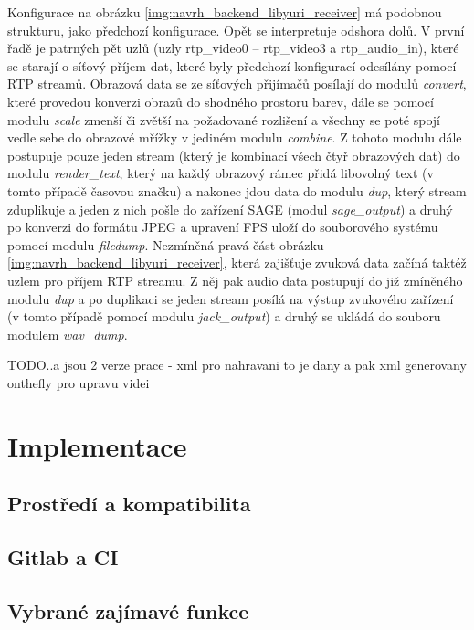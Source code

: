 \documentclass[thesis=M,czech]{FITthesis}[2012/06/26]
\begin{document}
Konfigurace na obrázku \ref{img:navrh_backend_libyuri_receiver} má podobnou strukturu, jako předchozí konfigurace. Opět se interpretuje odshora dolů. V první řadě je patrných pět uzlů (uzly rtp\_video0 -- rtp\_video3 a rtp\_audio\_in), které se starají o síťový příjem dat, které byly předchozí konfigurací odesílány pomocí RTP streamů. Obrazová data se ze síťových přijímačů posílají do modulů \textit{convert}, které provedou konverzi obrazů do shodného prostoru barev, dále se pomocí modulu \textit{scale} zmenší či zvětší na požadované rozlišení a všechny se poté spojí vedle sebe do obrazové mřížky v jediném modulu \textit{combine}. Z tohoto modulu dále postupuje pouze jeden stream (který je kombinací všech čtyř obrazových dat) do modulu \textit{render\_text}, který na každý obrazový rámec přidá libovolný text (v tomto případě časovou značku) a nakonec jdou data do modulu \textit{dup}, který stream zduplikuje a jeden z nich pošle do zařízení SAGE (modul \textit{sage\_output}) a druhý po konverzi do formátu JPEG a upravení FPS uloží do souborového systému pomocí modulu \textit{filedump}. Nezmíněná pravá část obrázku \ref{img:navrh_backend_libyuri_receiver}, která zajišťuje zvuková data začíná taktéž uzlem pro příjem RTP streamu. Z něj pak audio data postupují do již zmíněného modulu \textit{dup} a po duplikaci se jeden stream posílá na výstup zvukového zařízení (v tomto případě pomocí modulu \textit{jack\_output}) a druhý se ukládá do souboru modulem \textit{wav\_dump}.


TODO..a jsou 2 verze prace - xml  pro nahravani to je dany a pak xml generovany onthefly pro upravu videi


\chapter{Implementace} \label{chap:impl}
\section{Prostředí a kompatibilita} \label{sec:impl_prostredi}

\section{Gitlab a CI} \label{sec:impl_gitlab}

\section{Vybrané zajímavé funkce} \label{sec:impl_funkce}
\end{document}
